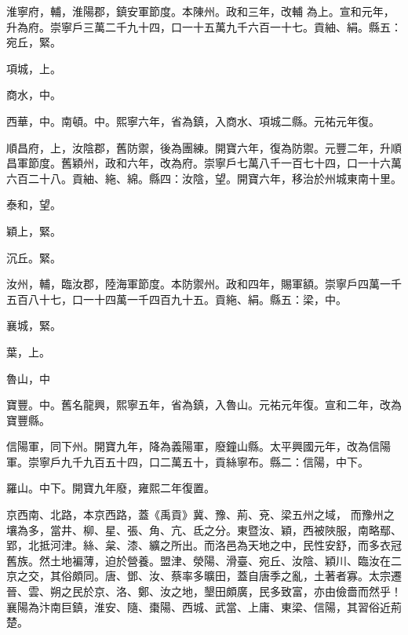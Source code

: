 \begin{pinyinscope}
 淮寧府，輔，淮陽郡，鎮安軍節度。本陳州。政和三年，改輔
 為上。宣和元年，升為府。崇寧戶三萬二千九十四，口一十五萬九千六百一十七。貢紬、絹。縣五：宛丘，緊。



 項城，上。



 商水，中。



 西華，中。南頓。中。熙寧六年，省為鎮，入商水、項城二縣。元祐元年復。



 順昌府，上，汝陰郡，舊防禦，後為團練。開寶六年，復為防禦。元豐二年，升順昌軍節度。舊穎州，政和六年，改為府。崇寧戶七萬八千一百七十四，口一十六萬六百二十八。貢紬、絁、綿。縣四：汝陰，望。開寶六年，移治於州城東南十里。



 泰和，望。



 穎上，緊。



 沉丘。緊。



 汝州，輔，臨汝郡，陸海軍節度。本防禦州。政和四年，賜軍額。崇寧戶四萬一千五百八十七，口一十四萬一千四百九十五。貢絁、絹。縣五：梁，中。



 襄城，緊。



 葉，上。



 魯山，中



 寶豐。中。舊名龍興，熙寧五年，省為鎮，入魯山。元祐元年復。宣和二年，改為寶豐縣。



 信陽軍，同下州。開寶九年，降為義陽軍，廢鐘山縣。太平興國元年，改為信陽軍。崇寧戶九千九百五十四，口二萬五十，貢絲寧布。縣二：信陽，中下。



 羅山。中下。開寶九年廢，雍熙二年復置。



 京西南、北路，本京西路，蓋《禹貢》冀、豫、荊、兗、梁五州之域，
 而豫州之壤為多，當井、柳、星、張、角、亢、氐之分。東暨汝、穎，西被陜服，南略鄢、郢，北抵河津。絲、枲、漆、纊之所出。而洛邑為天地之中，民性安舒，而多衣冠舊族。然土地褊薄，迫於營養。盟津、滎陽、滑臺、宛丘、汝陰、穎川、臨汝在二京之交，其俗頗同。唐、鄧、汝、蔡率多曠田，蓋自唐季之亂，土著者寡。太宗遷晉、雲、朔之民於京、洛、鄭、汝之地，墾田頗廣，民多致富，亦由儉嗇而然乎！襄陽為汴南巨鎮，淮安、隨、棗陽、西城、武當、上庸、東梁、信陽，其習俗近荊楚。



\end{pinyinscope}